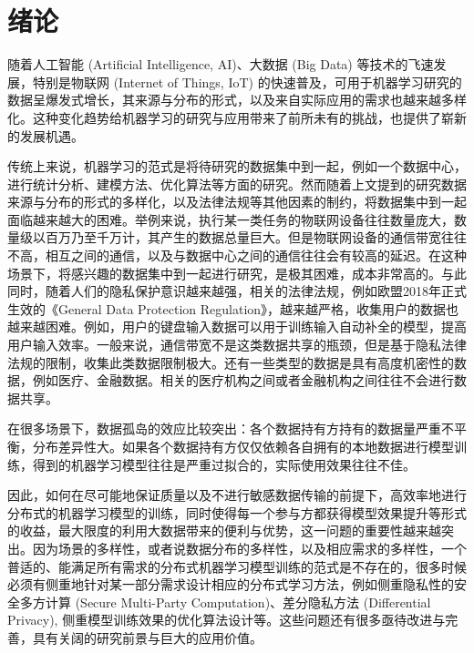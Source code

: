 \section{绪论}
\label{sec:chap1-introduction}


随着人工智能 (Artificial Intelligence, AI)、大数据 (Big Data) 等技术的飞速发展，特别是物联网 (Internet of Things, IoT) 的快速普及，可用于机器学习研究的数据呈爆发式增长，其来源与分布的形式，以及来自实际应用的需求也越来越多样化。这种变化趋势给机器学习的研究与应用带来了前所未有的挑战，也提供了崭新的发展机遇。

传统上来说，机器学习的范式是将待研究的数据集中到一起，例如一个数据中心，进行统计分析、建模方法、优化算法等方面的研究。然而随着上文提到的研究数据来源与分布的形式的多样化，以及法律法规等其他因素的制约，将数据集中到一起面临越来越大的困难。举例来说，执行某一类任务的物联网设备往往数量庞大，数量级以百万乃至千万计，其产生的数据总量巨大。但是物联网设备的通信带宽往往不高，相互之间的通信，以及与数据中心之间的通信往往会有较高的延迟。在这种场景下，将感兴趣的数据集中到一起进行研究，是极其困难，成本非常高的。与此同时，随着人们的隐私保护意识越来越强，相关的法律法规，例如欧盟2018年正式生效的《General Data Protection Regulation》，越来越严格，收集用户的数据也越来越困难\citep{Albrecht_2016}。例如，用户的键盘输入数据可以用于训练输入自动补全的模型，提高用户输入效率\citep{fl_keyboard}。一般来说，通信带宽不是这类数据共享的瓶颈，但是基于隐私法律法规的限制，收集此类数据限制极大。还有一些类型的数据是具有高度机密性的数据，例如医疗、金融数据。相关的医疗机构之间或者金融机构之间往往不会进行数据共享。

在很多场景下，数据孤岛的效应比较突出：各个数据持有方持有的数据量严重不平衡，分布差异性大。如果各个数据持有方仅仅依赖各自拥有的本地数据进行模型训练，得到的机器学习模型往往是严重过拟合的，实际使用效果往往不佳。

因此，如何在尽可能地保证质量以及不进行敏感数据传输的前提下，高效率地进行分布式的机器学习模型的训练，同时使得每一个参与方都获得模型效果提升等形式的收益，最大限度的利用大数据带来的便利与优势，这一问题的重要性越来越突出。因为场景的多样性，或者说数据分布的多样性，以及相应需求的多样性，一个普适的、能满足所有需求的分布式机器学习模型训练的范式是不存在的，很多时候必须有侧重地针对某一部分需求设计相应的分布式学习方法，例如侧重隐私性的安全多方计算 (Secure Multi-Party Computation)\cite{Bogetoft_2009_smpc}、差分隐私方法 (Differential Privacy)\citep{Dwork_2008_DP}, 侧重模型训练效果的优化算法设计\citep{boyd2011distributed}等。这些问题还有很多亟待改进与完善，具有关阔的研究前景与巨大的应用价值。
